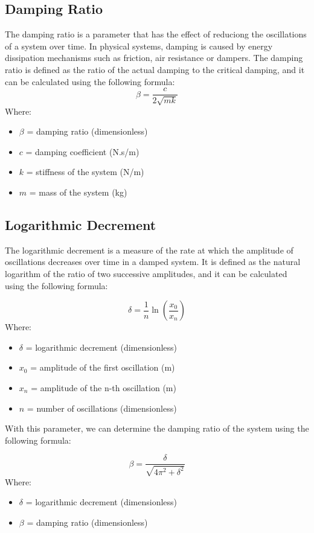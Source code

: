 \documentclass{article}  %
\begin{document}
\subsection{Damping Ratio}
The damping ratio is a parameter that has the effect of reduciong the oscillations of a system over time. In physical systems, damping is caused by energy dissipation mechanisms such as friction, air resistance or dampers. The damping ratio is defined as the ratio of the actual damping to the critical damping, and it can be calculated using the following formula:
\begin{equation}
\beta = \frac{c}{2\sqrt{mk}}
\end{equation}
Where:
\begin{itemize}
  \item $\beta$ = damping ratio (dimensionless)
  \item $c$ = damping coefficient (N.s/m)
  \item $k$ = stiffness of the system (N/m)
  \item $m$ = mass of the system (kg)
\end{itemize}

\subsection{Logarithmic Decrement}
The logarithmic decrement is a measure of the rate at which the amplitude of oscillations decreases over time in a damped system. It is defined as the natural logarithm of the ratio of two successive amplitudes, and it can be calculated using the following formula:

\begin{equation}
\delta = \frac{1}{n} \ln \left( \frac{x_0}{x_n} \right)
\end{equation}
Where:
\begin{itemize}
  \item $\delta$ = logarithmic decrement (dimensionless)
  \item $x_0$ = amplitude of the first oscillation (m)
  \item $x_n$ = amplitude of the n-th oscillation (m)
  \item $n$ = number of oscillations (dimensionless)
\end{itemize}

With this parameter, we can determine the damping ratio of the system using the following formula:

\begin{equation}
\beta = \frac{\delta}{\sqrt{4\pi^2 + \delta^2}}
\label{eq:log_dec}
\end{equation}
Where:
\begin{itemize}
  \item $\delta$ = logarithmic decrement (dimensionless)
  \item $\beta$ = damping ratio (dimensionless)
\end{itemize}
\end{document}
